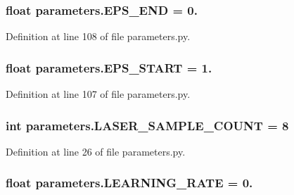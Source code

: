 \subsubsection[{\texorpdfstring{E\+P\+S\+\_\+\+E\+ND}{EPS_END}}]{\setlength{\rightskip}{0pt plus 5cm}float parameters.\+E\+P\+S\+\_\+\+E\+ND = 0.}\hypertarget{namespaceparameters_a3765f189d3af4815766ded3bffcba1e2}{}\label{namespaceparameters_a3765f189d3af4815766ded3bffcba1e2}


Definition at line 108 of file parameters.\+py.

\subsubsection[{\texorpdfstring{E\+P\+S\+\_\+\+S\+T\+A\+RT}{EPS_START}}]{\setlength{\rightskip}{0pt plus 5cm}float parameters.\+E\+P\+S\+\_\+\+S\+T\+A\+RT = 1.}\hypertarget{namespaceparameters_a371d0de003e9046dcc72450b7512ce14}{}\label{namespaceparameters_a371d0de003e9046dcc72450b7512ce14}


Definition at line 107 of file parameters.\+py.

\subsubsection[{\texorpdfstring{L\+A\+S\+E\+R\+\_\+\+S\+A\+M\+P\+L\+E\+\_\+\+C\+O\+U\+NT}{LASER_SAMPLE_COUNT}}]{\setlength{\rightskip}{0pt plus 5cm}int parameters.\+L\+A\+S\+E\+R\+\_\+\+S\+A\+M\+P\+L\+E\+\_\+\+C\+O\+U\+NT = 8}\hypertarget{namespaceparameters_a24735dce78cf9899cf1ec4bda2ea4eac}{}\label{namespaceparameters_a24735dce78cf9899cf1ec4bda2ea4eac}


Definition at line 26 of file parameters.\+py.

\subsubsection[{\texorpdfstring{L\+E\+A\+R\+N\+I\+N\+G\+\_\+\+R\+A\+TE}{LEARNING_RATE}}]{\setlength{\rightskip}{0pt plus 5cm}float parameters.\+L\+E\+A\+R\+N\+I\+N\+G\+\_\+\+R\+A\+TE = 0.}\hypertarget{namespaceparameters_afb996d542e8c3d3e8bbdfe4a711694dd}{}\label{namespaceparameters_afb996d542e8c3d3e8bbdfe4a711694dd}


